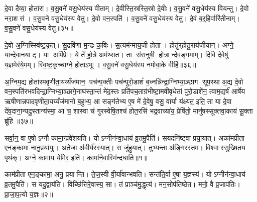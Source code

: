 दे॒वा दैव्या॒ होता॑रा। व॒सु॒वने॑ वसु॒धेय॑स्य वीताम्। दे॒वीस्ति॒स्रस्ति॒स्रो दे॒वीः। व॒सु॒वने॑ वसु॒धेय॑स्य वियन्तु। दे॒वो नरा॒शस॑। व॒सु॒वने॑ वसु॒धेय॑स्य वेतु। दे॒वो वन॒स्पति॑। व॒सु॒वने॑ वसु॒धेय॑स्य वेतु। दे॒वं ब॒र्॒हिर्वारि॑तीनाम्। व॒सु॒वने॑ वसु॒धेय॑स्य वेतु॥३५॥

दे॒वो अ॒ग्निस्स्वि॑ष्ट॒कृत्। सु॒द्रवि॑णा म॒न्द्रः क॒विः। स॒त्यम॑न्माय॒जी होता। होतु॑र्‌होतु॒राय॑जीयान्। अग्ने॒ यान्दे॒वानयाट्। या अपि॑प्रेः। ये ते॑ हो॒त्रे अम॑थ्सत। ता स॑स॒नुषी॒ होत्रान्देवङ्ग॒माम्। दि॒वि दे॒वेषु॑ य॒ज्ञमेर॑ये॒मम्। स्वि॒ष्ट॒कृच्चाग्ने॒ होताऽभूः। व॒सु॒वने॑ वसु॒धेय॑स्य नमोवा॒के वीहि॑॥३६॥\anuvakamend[वी॒ता॒व्वेँ॒त्वभू॒रेक॑ञ्च]

अ॒ग्निम॒द्य होता॑रमवृणीता॒यय्यँज॑मान॒ पच॑न्प॒क्तीः पच॑न्पुरो॒डाशं॑ ब॒ध्नन्नि॑न्द्रा॒ग्निभ्या॒ञ्छाग सूप॒स्था अ॒द्य दे॒वो वन॒स्पति॑रभवदिन्द्रा॒ग्निभ्या॒ञ्छागे॒नाघ॑स्ता॒न्तं मे॑द॒स्तः प्रति॑पच॒ताग्र॑भीष्टा॒मवी॑वृधेतां पुरो॒डाशे॑न॒ त्वाम॒द्यर्\mbox{}ष॑ आर्\mbox{}षेय ऋषीणान्नपादवृणीता॒यय्यँज॑मानो ब॒हुभ्य॒ आ सङ्ग॑तेभ्य ए॒ष मे॑ दे॒वेषु॒ वसु॒ वार्या य॑क्ष्यत॒ इति॒ ता या दे॒वा दे॑व॒दाना॒न्यदु॒स्तान्य॑स्मा॒ आ च॒ शास्वा च॑ गुरस्वेषि॒तश्च॑ होत॒रसि॑ भद्र॒वाच्या॑य॒ प्रेषि॑तो॒ मानु॑षस्सूक्तवा॒काय॑ सू॒क्ता ब्रू॑हि ॥३७॥\anuvakamend[अ॒ग्निम॒द्यैकम्]





\clearpage
{}
\setcounter{anuvakam}{0}
सर्वा॒न्॒ वा ए॒षोऽग्नौ कामा॒न्प्रवे॑शयति। योऽग्नीन॑न्वा॒धाय॑ व्र॒तमु॒पैति॑। सयदनि॑ष्ट्वा प्रया॒यात्। अका॑मप्रीता एन॒ङ्कामा॒ नानु॒प्रया॑युः। अ॒ते॒जा अ॑वी॒र्य॑स्स्यात्। स जु॑हुयात्। तुभ्य॒न्ता अ॑ङ्गिरस्तम। विश्वास्सुख्षि॒तय॒ पृथ॑क्। अग्ने॒ कामा॑य येमिर॒ इति॑। कामा॑ने॒वास्मि॑न्दधाति॥१॥

काम॑प्रीता एन॒ङ्कामा॒ अनु॒ प्रयान्ति। ते॒ज॒स्वी वी॒र्या॑वान्भवति। सन्त॑ति॒र्वा ए॒षा य॒ज्ञस्य॑। योऽग्नीन॑न्वा॒धाय॑ व्र॒तमु॒पैति॑। स यदु॒द्वाय॑ति। विच्छि॑त्तिरे॒वास्य॒ सा। तं प्राञ्च॑मु॒द्धृत्य॑। मन॒सोप॑तिष्ठेत। मनो॒ वै प्र॒जाप॑तिः। प्रा॒जा॒प॒त्यो य॒ज्ञः॥२॥


